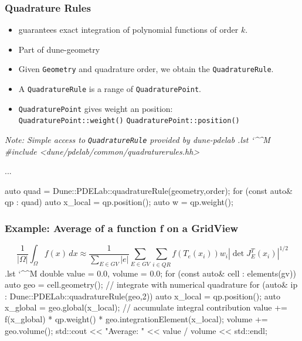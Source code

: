 \documentclass[ignorenonframetext,11pt]{beamer}
\makeatletter
\theoremstyle{definition}
\newenvironment{codeblock}{%
  \begin{tcolorbox}[size=small,oversize,boxrule=0pt,opacityframe=0,colback=blue!30!black!5!white]}{%
  \end{tcolorbox}}
\newenvironment{cppcode}{%
  \begingroup
  \@bsphack
  \immediate\openout\lstvrb@out\jobname.lst
  \let\do\@makeother\dospecials\catcode`\^^M\active
  \def\verbatim@processline{%
    \immediate\write\lstvrb@out{\the\verbatim@line}}%
  \verbatim@start}{%
  \immediate\closeout\lstvrb@out
  \@esphack
  \endgroup
  \begin{codeblock}
    \vspace*{-1ex}
    
    \vspace*{-1ex}
  \end{codeblock}}
\newcommand{\diffd}{\,d}
\makeatother
\begin{document}
\begin{frame}[fragile]
  \frametitle{Quadrature Rules}

  \begin{itemize}
  \item guarantees exact integration of polynomial functions of order $k$.
  \item Part of dune-geometry
  \item Given
    \lstinline!Geometry! and quadrature
    order, we obtain the \lstinline!QuadratureRule!.
  \item A \lstinline!QuadratureRule! is a range of
    \lstinline!QuadraturePoint!.
  \item \lstinline!QuadraturePoint! gives weight an position:\\
    \lstinline!QuadraturePoint::weight()!\hfill
    \lstinline!QuadraturePoint::position()!
  \end{itemize}

  \pause\footnotesize
  \em Note: Simple access to \lstinline!QuadratureRule! provided by
  dune-pdelab\em
\begin{cppcode}
#include <dune/pdelab/common/quadraturerules.hh>

...

auto quad = Dune::PDELab::quadratureRule(geometry,order);
for (const auto& qp : quad)
{
    auto x_local = qp.position();
    auto w = qp.weight();
}
\end{cppcode}

  \end{frame}

\begin{frame}[fragile]
\frametitle{Example: Average of a function f on a GridView}
\begin{equation*}
\frac{1}{|\Omega|}\int_{\Omega}f(x) \diffd x\approx\frac{1}{\sum_{E \in GV} |e|}\sum_{E \in GV}\sum_{i \in QR} f(T_e(x_i)) w_i |\det J_E^T(x_i)|^{1/2}
\end{equation*}
  \begin{cppcode}
double value = 0.0, volume = 0.0;
for (const auto& cell : elements(gv)) {
  auto geo = cell.geometry();
  // integrate with numerical quadrature
  for (auto& ip : Dune::PDELab::quadratureRule(geo,2)) {
    auto x_local = qp.position();
    auto x_global = geo.global(x_local);
    // accumulate integral contribution
    value += f(x_global) *
             qp.weight() * geo.integrationElement(x_local);
  }
  volume += geo.volume();
}
std::cout << "Average: " << value / volume << std::endl;
\end{cppcode}

\end{frame}
\end{document}
